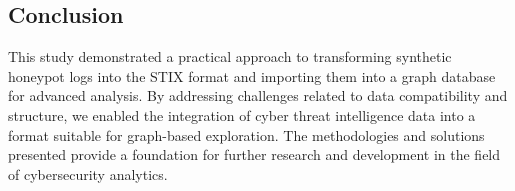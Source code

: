 \documentclass[conference]{IEEEtran}
\begin{document}
\subsection{Conclusion}

This study demonstrated a practical approach to transforming synthetic honeypot logs into the STIX format and importing them into a graph database for advanced analysis. By addressing challenges related to data compatibility and structure, we enabled the integration of cyber threat intelligence data into a format suitable for graph-based exploration. The methodologies and solutions presented provide a foundation for further research and development in the field of cybersecurity analytics.




\end{document}
